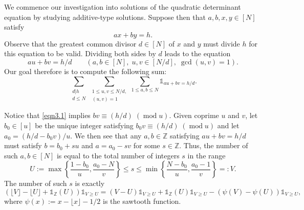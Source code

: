 \documentclass[12pt,reqno]{amsart}
\theoremstyle{definition}
\theoremstyle{remark}
\numberwithin{equation}{section}
\DeclareMathOperator{\Mod}{mod}
\newcommand{\mmod}[1]{\;(\Mod{ #1})}
\renewcommand{\geq}{\geqslant}
\renewcommand{\leq}{\leqslant}
\def \Z {\mathbb{Z}}
\newcommand\1{\mathds{1}}
\begin{document}
We commence our investigation into solutions of the quadratic determinant equation by studying additive-type solutions. Suppose then that $a,b,x,y\in[N]$ satisfy
\begin{equation}\label{eqn3.1}
    ax + by = h.
\end{equation}
Observe that the greatest common divisor $d\in[N]$ of $x$ and $y$ must divide $h$ for this equation to be valid. Dividing both sides by $d$ leads to the equation
\begin{equation*}
    au + bv = h/d\qquad (a,b\in[N],\; u,v\in[N/d],\; \gcd(u,v) =1).
\end{equation*}
Our goal therefore is to compute the following sum:
\begin{equation*}
    \sum_{\substack{d|h \\ d \leqslant N}} \sum_{\substack{1 \leq u,v \leq N/d,\\ (u,v) = 1}} \sum_{1 \leq a,b \leq N} \1_{au + bv = h/d} .
\end{equation*}

Notice that \eqref{eqn3.1} implies $bv \equiv  (h/d) \mmod{u}$. Given coprime $u$ and $v$, let $b_0 \in [u]$ be the unique integer satisfying $b_0 v \equiv (h/d) \mmod{u}$ and let $a_0 = (h/d - b_0v)/u$. We then see that any $a,b \in \mathbb{Z}$ satisfying $au + bv = h/d$ must satisfy $b = b_0 + su$ and $a= a_0 - sv$ for some $s\in\Z$. Thus, the number of such $a,b\in[N]$ is equal to the total number of integers $s$ in the range
\begin{equation}\label{eqn3.2}
U := \max\left\{ \frac{1- b_0}{u}, \frac{a_0 - N}{v} \right\} \leq s \leq \min \left\{ \frac{N- b_0}{u}, \frac{a_0 - 1}{v}\right\} =:  V.
\end{equation}
The number of such $s$ is exactly 
\begin{equation*}
    (  \lfloor V \rfloor- \lfloor U \rfloor + \1_{\mathbb{Z}}(U) ) \1_{V \geq U} = (V-U)\1_{V \geq U} + \1_{\mathbb{Z}}(U)\1_{V \geq U} - ( \psi(V) - \psi(U))\1_{V \geq U},
\end{equation*}
where $\psi(x) := x - \lfloor x \rfloor - 1/2$ is the sawtooth function.
\end{document}
